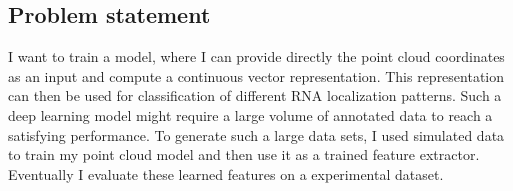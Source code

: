 \subsection{Problem statement}
\label{subsec:problem_statement}

I want to train a model, where I can provide directly the point cloud coordinates as an input and compute a continuous vector representation.
This representation can then be used for classification of different \ac{RNA} localization patterns.
Such a deep learning model might require a large volume of annotated data to reach a satisfying performance.
To generate such a large data sets, I used simulated data to train my point cloud model and then use it as a trained feature extractor.
Eventually I evaluate these learned features on a experimental dataset.

